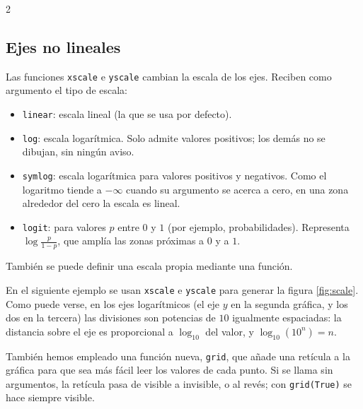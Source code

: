 \begin{paracol}{2}
\subsection{Ejes no lineales}
Las funciones \texttt{xscale} e \texttt{yscale} cambian la escala de los ejes. Reciben como argumento el tipo de escala:
    \begin{itemize}
        \item \texttt{\textquotesingle{}linear\textquotesingle{}}: escala lineal (la que se usa por defecto).
        \item \texttt{\textquotesingle{}log\textquotesingle{}}: escala logarítmica. Solo admite valores positivos; los demás no se dibujan, sin ningún aviso.
        \item \texttt{\textquotesingle{}symlog\textquotesingle{}}: escala logarítmica para valores positivos y negativos. Como el logaritmo tiende a $-\infty$ cuando su argumento se acerca a cero, en una zona alrededor del cero la escala es lineal.
        \item \texttt{\textquotesingle{}logit\textquotesingle{}}: para valores $p$ entre $0$ y $1$ (por ejemplo, probabilidades). Representa $\log\frac{p}{1-p}$, que amplía las zonas próximas a $0$ y a $1$.
    \end{itemize}
También se puede definir una escala propia mediante una función.

En el siguiente ejemplo se usan \texttt{xscale} e \texttt{yscale} para generar la figura \ref{fig:scale}. Como puede verse, en los ejes logarítmicos (el eje $y$ en la segunda gráfica, y los dos en la tercera) las divisiones son potencias de $10$ igualmente espaciadas: la distancia sobre el eje es proporcional a $\log_{10}$ del valor, y $\log_{10}(10^n)=n$.

También hemos empleado una función nueva, \texttt{grid}, que añade una retícula a la gráfica para que sea más fácil leer los valores de cada punto. Si se llama sin argumentos, la retícula pasa de visible a invisible, o al revés; con \texttt{grid(True)} se hace siempre visible.
\switchcolumn

\end{paracol}
